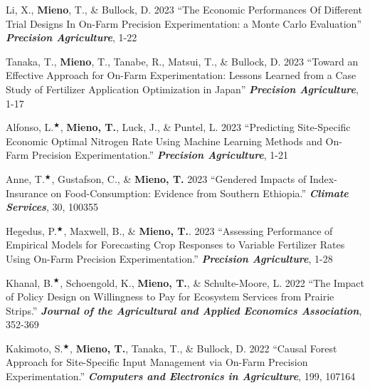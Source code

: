 \documentclass[10pt,margin,line]{res}
\newenvironment{list1}{
  \begin{list}{\ding{113}}{%
      \setlength{\itemsep}{0in}
      \setlength{\parsep}{0in} \setlength{\parskip}{0in}
      \setlength{\topsep}{0in} \setlength{\partopsep}{0in}
      \setlength{\leftmargin}{0.17in}}}{\end{list}}
\begin{document}
\begin{resume}
\begin{list1}
\item[] Li, X., \textbf{Mieno}, T., \& Bullock, D. 2023 ``The Economic Performances Of Different Trial Designs In On-Farm Precision Experimentation: a Monte Carlo Evaluation'' \textit{\textbf{Precision Agriculture}}, 1-22
\vspace*{0.3cm}

\item[] Tanaka, T., \textbf{Mieno}, T., Tanabe, R., Matsui, T., \& Bullock, D. 2023 ``Toward an Effective Approach for On-Farm Experimentation: Lessons Learned from a Case Study of Fertilizer Application Optimization in Japan'' \textit{\textbf{Precision Agriculture}}, 1-17
\vspace*{0.3cm}

\item[] Alfonso, L.$^\bigstar$, \textbf{Mieno, T.}, Luck, J., \& Puntel, L. 2023 ``Predicting Site-Specific Economic Optimal Nitrogen Rate Using Machine Learning Methods and On-Farm Precision Experimentation.'' \textit{\textbf{Precision Agriculture}}, 1-21
\vspace*{0.3cm}

\item[] Anne, T.$^\bigstar$, Gustafson, C., \& \textbf{Mieno, T.} 2023 ``Gendered Impacts of Index-Insurance on Food-Consumption: Evidence from Southern Ethiopia.'' \textit{\textbf{Climate Services}}, 30, 100355
\vspace*{0.3cm}

\item[] Hegedus, P.$^\bigstar$, Maxwell, B., \& \textbf{Mieno, T.}. 2023 ``Assessing Performance of Empirical Models for Forecasting Crop Responses to Variable Fertilizer Rates Using On-Farm Precision Experimentation.'' \textit{\textbf{Precision Agriculture}}, 1-28
\vspace*{0.3cm}

\item[] Khanal, B.$^\bigstar$, Schoengold, K., \textbf{Mieno, T.}, \& Schulte-Moore, L. 2022 ``The Impact of Policy Design on Willingness to Pay for Ecosystem Services from Prairie Strips.'' \textit{\textbf{Journal of the Agricultural and Applied Economics Association}}, 352-369
\vspace*{0.3cm}

\item[] Kakimoto, S.$^\bigstar$, \textbf{Mieno, T.}, Tanaka, T., \& Bullock, D. 2022 ``Causal Forest Approach for Site-Specific Input Management via On-Farm Precision Experimentation.'' \textit{\textbf{Computers and Electronics in Agriculture}}, 199, 107164
\vspace*{0.3cm}


\end{list1}
\end{resume}
\end{document}
